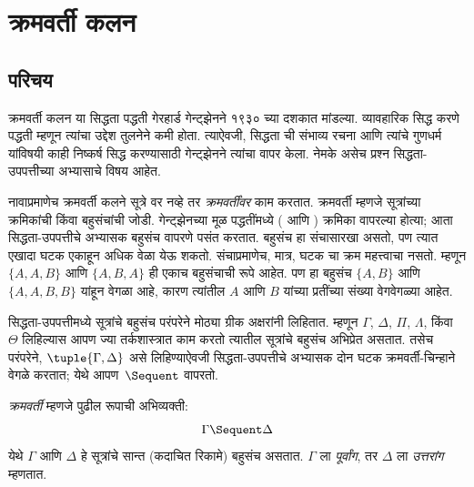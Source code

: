 \chapter{क्रमवर्ती कलन}\label{pt:seq:chap}










\section{परिचय}\label{pt:seq:int:sec}

क्रमवर्ती कलन या सिद्धता पद्धती गेरहार्ड
गेन्ट्झेनने १९३० च्या दशकात मांडल्या. व्यावहारिक
सिद्ध करणे पद्धती म्हणून त्यांचा उद्देश तुलनेने कमी
होता. त्याऐवजी, सिद्धता ची संभाव्य रचना आणि
त्यांचे गुणधर्म यांविषयी काही निष्कर्ष सिद्ध करण्यासाठी
गेन्ट्झेनने त्यांचा वापर केला. नेमके असेच प्रश्न
सिद्धता-उपपत्तीच्या अभ्यासाचे विषय आहेत.

नावाप्रमाणेच क्रमवर्ती कलने सूत्रे वर
नव्हे तर \emph{क्रमवर्तींवर} काम करतात. क्रमवर्ती
म्हणजे सूत्रांच्या क्रमिकांची किंवा बहुसंचांची
जोडी. गेन्ट्झेनच्या मूळ पद्धतींमध्ये ( आणि
) क्रमिका वापरल्या होत्या; आता
सिद्धता-उपपत्तीचे अभ्यासक बहुसंच वापरणे पसंत करतात.
बहुसंच हा संचासारखा असतो, पण त्यात एखादा
घटक एकाहून अधिक वेळा येऊ शकतो.
संचाप्रमाणेच, मात्र, घटक चा क्रम महत्त्वाचा
नसतो. म्हणून $\{A, A, B\}$ आणि
$\{A, B, A\}$ ही एकाच बहुसंचाची रूपे आहेत.
पण हा बहुसंच $\{A,
B\}$ आणि $\{A, A, B, B\}$ यांहून वेगळा आहे,
कारण त्यांतील $A$ आणि $B$ यांच्या प्रतींच्या
संख्या वेगवेगळ्या आहेत.

सिद्धता-उपपत्तीमध्ये सूत्रांचे बहुसंच
परंपरेने मोठ्या ग्रीक अक्षरांनी लिहितात. म्हणून
$\Gamma$, $\Delta$, $\Pi$, $\Lambda$, किंवा
$\Theta$ लिहिल्यास आपण ज्या तर्कशास्त्रात काम
करतो त्यातील सूत्रांचे बहुसंच अभिप्रेत असतात.
तसेच परंपरेने, $\tuple{\Gamma, \Delta}$ असे लिहिण्याऐवजी
सिद्धता-उपपत्तीचे अभ्यासक दोन घटक क्रमवर्ती-चिन्हाने
वेगळे करतात; येथे आपण~$\Sequent$ वापरतो.

\begin{defn}[क्रमवर्ती]
\emph{क्रमवर्ती} म्हणजे पुढील रूपाची अभिव्यक्ती:
\[
\Gamma \Sequent \Delta
\]
येथे $\Gamma$ आणि $\Delta$ हे सूत्रांचे
सान्त (कदाचित रिकामे) बहुसंच असतात. $\Gamma$ ला
\emph{पूर्वांग}, तर $\Delta$ ला \emph{उत्तरांग} म्हणतात.
\end{defn}

